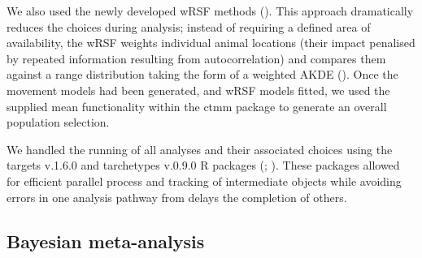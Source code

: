 \documentclass[10pt,a4paper]{article}
\begin{document}
We also used the newly developed wRSF methods ().
This approach dramatically reduces the choices during analysis; instead of requiring a defined area of availability, the wRSF weights individual animal locations (their impact penalised by repeated information resulting from autocorrelation) and compares them against a range distribution taking the form of a weighted AKDE ().
Once the movement models had been generated, and wRSF models fitted, we used the supplied mean functionality within the ctmm package to generate an overall population selection.

We handled the running of all analyses and their associated choices using the targets v.1.6.0 and tarchetypes v.0.9.0 R packages (; ).
These packages allowed for efficient parallel process and tracking of intermediate objects while avoiding errors in one analysis pathway from delays the completion of others.

\subsection{Bayesian meta-analysis}\label{bayesian-meta-analysis}
\end{document}
